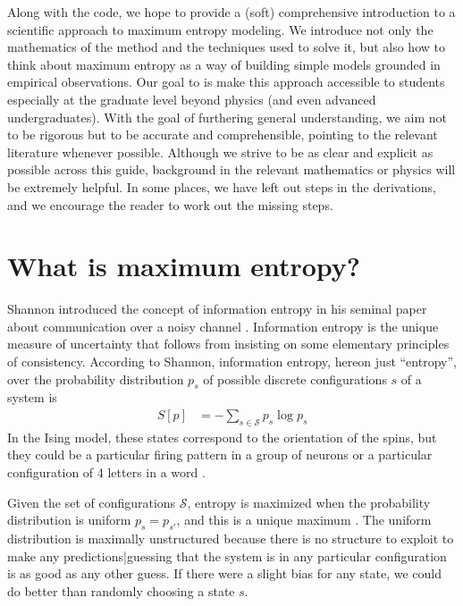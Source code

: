 \documentclass[aps,prl,twocolumn]{revtex4-1}
\begin{document}
Along with the code, we hope to provide a (soft) comprehensive introduction to a scientific approach to maximum entropy modeling. We introduce not only the mathematics of the method and the techniques used to solve it, but also how to think about maximum entropy as a way of building simple models grounded in empirical observations.
Our goal to is make this approach accessible to students especially at the graduate level beyond physics (and even advanced undergraduates). With the goal of furthering general understanding, we aim not to be rigorous but to be accurate and comprehensible, pointing to the relevant literature whenever possible. Although we strive to be as clear and explicit as possible across this guide, background in the relevant mathematics or physics will be extremely helpful. In some places, we have left out steps in the derivations, and we encourage the reader to work out the missing steps.

\section{What is maximum entropy?}
Shannon introduced the concept of information entropy in his seminal paper about communication over a noisy channel \cite{Shannon:1948wk}. Information entropy is the unique measure of uncertainty that follows from insisting on some elementary principles of consistency. According to Shannon, information entropy, hereon just ``entropy'', over the probability distribution $p_s$ of possible discrete configurations $s$ of a system is
\begin{align}
	S[p] &= -\sum_{s\in \mathcal{S}} p_s \log p_s
\end{align}
In the Ising model, these states correspond to the orientation of the spins, but they could be a particular firing pattern in a group of neurons \cite{Schneidman:2006he} or a particular configuration of 4 letters in a word \cite{Stephens:2010hi}.

Given the set of configurations $\mathcal{S}$, entropy is maximized when the probability distribution is uniform $p_s = p_{s'}$, and this is a unique maximum \cite{Cover:2006tl}. The uniform distribution is maximally unstructured because there is no structure to exploit to make any predictions|guessing that the system is in any particular configuration is as good as any other guess. If there were a slight bias for any state, we could do better than randomly choosing a state $s$.
\end{document}
